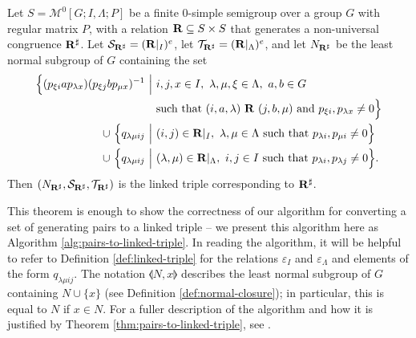 \begin{theorem}
  \label{thm:pairs-to-linked-triple}
  Let $S = \mathcal{M}^0[G;I,\Lambda;P]$ be a finite 0-simple semigroup over a
  group $G$ with regular matrix $P$, with a relation $\mathbf{R} \subseteq S \times S$
  that generates a non-universal congruence $\mathbf{R}^\sharp$.  Let
  $\mathcal{S}_{\mathbf{R}^\sharp} = (\mathbf{R}|_I)^e$, let
  $\mathcal{T}_{\mathbf{R}^\sharp} = (\mathbf{R}|_\Lambda)^e$, and let $N_{\mathbf{R}^\sharp}$ be
  the least normal subgroup of $G$ containing the set
  \begin{align*}
    \Big\{(p_{\xi i} a p_{\lambda x}) (p_{\xi j} b p_{\mu x})^{-1} ~\Big|~
    & i,j,x \in I,\ \lambda, \mu, \xi \in \Lambda,\ a,b \in G \\
    & \text{such that~} (i,a,\lambda) ~\mathbf{R}~ (j,b,\mu) \text{~and~}
      p_{\xi i}, p_{\lambda x} \neq 0\Big\} \\
    \cup~ \Big\{q_{\lambda \mu i j} ~\Big|~ &
           (i,j) \in \mathbf{R}|_I,~
           \lambda,\mu \in \Lambda ~\textnormal{such that}~
           p_{\lambda i}, p_{\mu i} \neq 0\Big\} \\
    \cup~ \Big\{q_{\lambda \mu i j} ~\Big|~ &
           (\lambda,\mu) \in \mathbf{R}|_\Lambda,~
           i,j \in I ~\textnormal{such that}~
           p_{\lambda i}, p_{\lambda j} \neq 0\Big\}. \\
  \end{align*}
  Then $(N_{\mathbf{R}^\sharp}, \mathcal{S}_{\mathbf{R}^\sharp}, \mathcal{T}_{\mathbf{R}^\sharp})$
  is the linked triple corresponding to $\mathbf{R}^\sharp$.
\end{theorem}

This theorem is enough to show the correctness of our algorithm for converting a
set of generating pairs to a linked triple -- we present this algorithm here as
Algorithm \ref{alg:pairs-to-linked-triple}.  In reading the algorithm, it will
be helpful to refer to Definition \ref{def:linked-triple} for the relations
$\varepsilon_I$ and $\varepsilon_\Lambda$ and elements of the form
$q_{\lambda \mu i j}$.  The notation $\llangle N, x \rrangle$ describes the
least normal subgroup of $G$ containing $N \cup \{x\}$ (see Definition
\ref{def:normal-closure}); in particular, this is equal to $N$ if $x \in N$.
For a fuller description of the algorithm and how it is justified by Theorem
\ref{thm:pairs-to-linked-triple}, see \cite[\S 3.2]{mtorpey_msc}.

